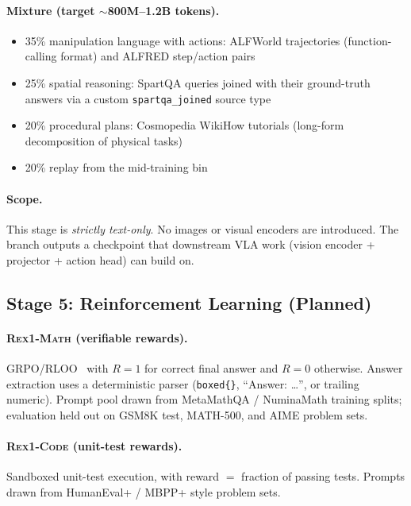 \documentclass[11pt,a4paper]{article}
\begin{document}
\paragraph{Mixture (target $\sim$800M--1.2B tokens).}
\begin{itemize}[noitemsep,leftmargin=*]
  \item 35\% manipulation language with actions: ALFWorld trajectories
    (function-calling format) and ALFRED step/action pairs
  \item 25\% spatial reasoning: SpartQA queries joined with their ground-truth
    answers via a custom \texttt{spartqa\_joined} source type
  \item 20\% procedural plans: Cosmopedia WikiHow tutorials (long-form
    decomposition of physical tasks)
  \item 20\% replay from the mid-training bin
\end{itemize}

\paragraph{Scope.}
This stage is \emph{strictly text-only}. No images or visual encoders are
introduced. The branch outputs a checkpoint that downstream VLA work
(vision encoder + projector + action head) can build on.

\subsection{Stage 5: Reinforcement Learning (Planned)}

\paragraph{\textsc{Rex1-Math} (verifiable rewards).}
GRPO/RLOO~\cite{grpo} with $R = 1$ for correct final answer and $R = 0$
otherwise. Answer extraction uses a deterministic parser
(\texttt{boxed\{\}}, ``Answer: \dots'', or trailing numeric). Prompt pool drawn
from MetaMathQA / NuminaMath training splits; evaluation held out on GSM8K
test, MATH-500, and AIME problem sets.

\paragraph{\textsc{Rex1-Code} (unit-test rewards).}
Sandboxed unit-test execution, with reward $=$ fraction of passing tests.
Prompts drawn from HumanEval+ / MBPP+ style problem sets.
\end{document}

